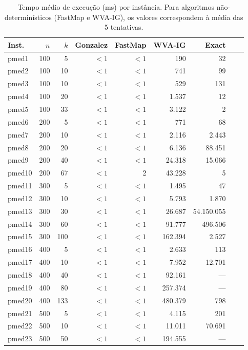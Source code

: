 \documentclass[12pt]{article}
\begin{document}
\begin{table}[p]
\centering
\caption{Tempo m\'edio de execu\c{c}\~ao (ms) por inst\^ancia. Para algoritmos n\~ao-determin\'isticos (FastMap e WVA-IG), os valores correspondem \`a m\'edia das 5 tentativas.}
\label{tab:tempo}
\small
\begin{tabular}{lrrrrrrrr}
\hline
Inst. & $n$ & $k$ & Gonzalez & FastMap & WVA-IG & Exact \\
\hline
pmed1  & 100 & 5   & $< 1$ & $< 1$ & 190    & 32 \\
pmed2  & 100 & 10  & $< 1$ & $< 1$ & 741    & 99 \\
pmed3  & 100 & 10  & $< 1$ & $< 1$ & 529    & 131 \\
pmed4  & 100 & 20  & $< 1$ & $< 1$ & 1.537  & 12 \\
pmed5  & 100 & 33  & $< 1$ & $< 1$ & 3.122  & 2 \\
pmed6  & 200 & 5   & $< 1$ & $< 1$ & 771    & 68 \\
pmed7  & 200 & 10  & $< 1$ & $< 1$ & 2.116  & 2.443 \\
pmed8  & 200 & 20  & $< 1$ & $< 1$ & 6.136  & 88.451 \\
pmed9  & 200 & 40  & $< 1$ & $< 1$ & 24.318 & 15.066 \\
pmed10 & 200 & 67  & $< 1$ & 2     & 43.228 & 5 \\
pmed11 & 300 & 5   & $< 1$ & $< 1$ & 1.495  & 47 \\
pmed12 & 300 & 10  & $< 1$ & $< 1$ & 5.793  & 1.870 \\
pmed13 & 300 & 30  & $< 1$ & $< 1$ & 26.687 & 54.150.055 \\
pmed14 & 300 & 60  & $< 1$ & $< 1$ & 91.777 & 496.506 \\
pmed15 & 300 & 100 & $< 1$ & $< 1$ & 162.394 & 2.527 \\
pmed16 & 400 & 5   & $< 1$ & $< 1$ & 2.633  & 113 \\
pmed17 & 400 & 10  & $< 1$ & $< 1$ & 7.952  & 12.701 \\
pmed18 & 400 & 40  & $< 1$ & $< 1$ & 92.161 & --- \\
pmed19 & 400 & 80  & $< 1$ & $< 1$ & 257.374 & --- \\
pmed20 & 400 & 133 & $< 1$ & $< 1$ & 480.379 & 798 \\
pmed21 & 500 & 5   & $< 1$ & $< 1$ & 4.115  & 201 \\
pmed22 & 500 & 10  & $< 1$ & $< 1$ & 11.011 & 70.691 \\
pmed23 & 500 & 50  & $< 1$ & $< 1$ & 194.555 & --- \\

\end{tabular}
\end{table}
\end{document}
